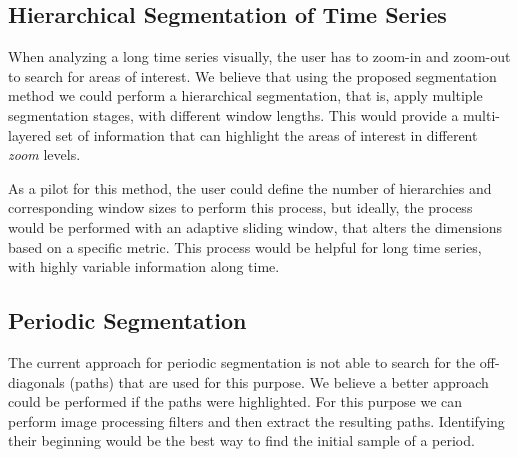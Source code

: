 

\subsection{Hierarchical Segmentation of Time Series}

When analyzing a long time series visually, the user has to zoom-in and zoom-out to search for areas of interest. We believe that using the proposed segmentation method we could perform a hierarchical segmentation, that is, apply multiple segmentation stages, with different window lengths. This would provide a multi-layered set of information that can highlight the areas of interest  in different \textit{zoom} levels.
\par
As a pilot for this method, the user could define the number of hierarchies  and corresponding window sizes to perform this process, but ideally, the process would be performed with an adaptive sliding window, that alters the dimensions based on a specific metric. This process would be helpful for long time series, with highly variable information along time.

\subsection{Periodic Segmentation}

The current approach for periodic segmentation is not able to search for the off-diagonals (paths) that are used for this purpose. We believe a better approach could be performed if the paths were highlighted. For this purpose we can perform image processing filters and then extract the resulting paths. Identifying their beginning would be the best way to find the initial sample of a period. 

